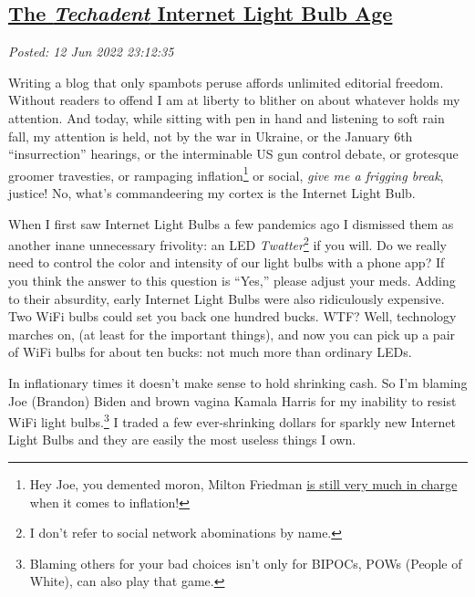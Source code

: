 %

\subsection*{\href{http://analyzethedatanotthedrivel.org/2022/06/12/the-techadent-internet-light-bulb-age/}{The \emph{Techadent} Internet Light Bulb Age}}


\noindent\emph{Posted: 12 Jun 2022 23:12:35}
\vspace{6pt}

Writing a blog that only spambots peruse affords unlimited editorial
freedom. Without readers to offend I am at liberty to blither on about
whatever holds my attention. And today, while sitting with pen in hand
and listening to soft rain fall, my attention is held, not by the war in
Ukraine, or the January 6th ``insurrection'' hearings, or the
interminable US gun control debate, or grotesque groomer travesties, or
rampaging
inflation\footnote{Hey Joe, you demented moron, Milton Friedman \href{https://www.wsj.com/articles/milton-friedman-biden-spending-inflation-free-market-carter-afghanistan-southern-border-11637014161}{is still very much in
  charge} when it comes to inflation!
}%
or social, \emph{give me a frigging break}, justice! No, what's
commandeering my cortex is the Internet Light Bulb.

When I first saw Internet Light Bulbs a few pandemics ago I dismissed
them as another inane unnecessary frivolity: an LED
\emph{Twatter}\footnote{I don't refer to social network abominations by
  name.
}%
if you will. Do we really need to control the color and intensity of our
light bulbs with a phone app? If you think the answer to this question
is ``Yes,'' please adjust your meds. Adding to their absurdity, early
Internet Light Bulbs were also ridiculously expensive. Two WiFi bulbs
could set you back one hundred bucks. WTF? Well, technology marches on,
(at least for the important things), and now you can pick up a pair of
WiFi bulbs for about ten bucks: not much more than ordinary LEDs.

In inflationary times it doesn't make sense to hold shrinking cash. So
I'm blaming Joe (Brandon) Biden and brown vagina Kamala Harris for my
inability to resist WiFi light
bulbs.\footnote{Blaming others for your bad choices isn't only for BIPOCs, POWs
  (People of White), can also play that
  game.
}%
I traded a few ever-shrinking dollars for sparkly new Internet Light
Bulbs and they are easily the most useless things I own.

